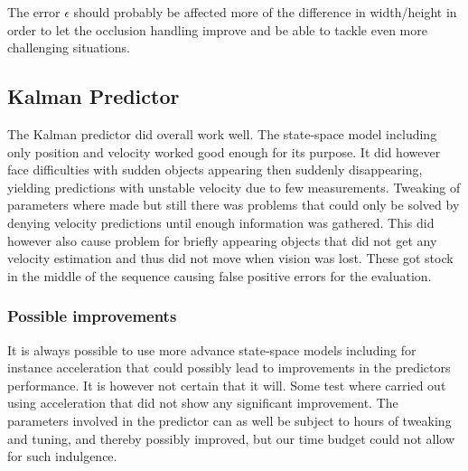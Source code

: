 The error $\epsilon$ should probably be affected more of the difference in width/height in order to let the occlusion handling improve and be able to tackle even more challenging situations.

\subsection{Kalman Predictor}
The Kalman predictor did overall work well. The state-space model including only position and velocity worked good enough for its purpose. It did however face difficulties with sudden objects appearing then suddenly disappearing, yielding predictions with unstable velocity due to few measurements. Tweaking of parameters
where made but still there was problems that could only be solved by denying velocity predictions until enough information was gathered. This did however also cause problem for briefly appearing objects that did not get any velocity estimation and thus did not move when vision was lost. These got stock in the middle of the sequence causing false positive errors for the evaluation.

\subsubsection{Possible improvements}
It is always possible to use more advance state-space models including for instance acceleration that could possibly lead to improvements in the predictors performance. It is however not certain that it will. Some test where carried out using acceleration that did not show any significant improvement. The parameters involved in the predictor can as well be subject to hours of tweaking and tuning, and thereby possibly improved, but our time budget could not allow for such indulgence. 















